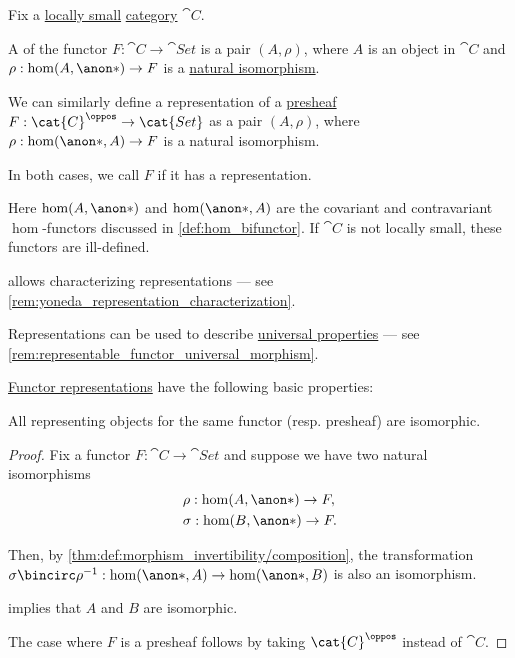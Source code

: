 \begin{definition}\label{def:functor_representation}
  Fix a \hyperref[def:small_category]{locally small} \hyperref[def:category]{category} \( \cat{C} \).

  A  of the functor \( F: \cat{C} \to \cat{Set} \) is a pair \( (A, \rho) \), where \( A \) is an object in \( \cat{C} \) and \( \rho: \hom(A, \anon*) \to F \) is a \hyperref[def:natural_isomorphism]{natural isomorphism}.

  We can similarly define a representation of a \hyperref[def:presheaf]{presheaf} \( F: \cat{C}^\oppos \to \cat{Set} \) as a pair \( (A, \rho) \), where \( \rho: \hom(\anon*, A) \to F \) is a natural isomorphism.

  In both cases, we call \( F \)  if it has a representation.
\end{definition}
\begin{comments}
  \item Here \( \hom(A, \anon*) \) and \( \hom(\anon*, A) \) are the covariant and contravariant \( \hom \)-functors discussed in \cref{def:hom_bifunctor}. If \( \cat{C} \) is not locally small, these functors are ill-defined.

  \item {} allows characterizing representations --- see \cref{rem:yoneda_representation_characterization}.

  \item Representations can be used to describe \hyperref[con:universal_property]{universal properties} --- see \cref{rem:representable_functor_universal_morphism}.
\end{comments}

\begin{proposition}\label{thm:def:functor_representation}
  \hyperref[def:functor_representation]{Functor representations} have the following basic properties:
  \begin{thmenum}
     All representing objects for the same functor (resp. presheaf) are isomorphic.
  \end{thmenum}
\end{proposition}
\begin{proof}
   Fix a functor \( F: \cat{C} \to \cat{Set} \) and suppose we have two natural isomorphisms
  \begin{align*}
    &\rho: \hom(A, \anon*) \to F, \\
    &\sigma: \hom(B, \anon*) \to F.
  \end{align*}

  Then, by \cref{thm:def:morphism_invertibility/composition}, the transformation \( \sigma \bincirc \rho^{-1}: \hom(\anon*, A) \to \hom(\anon*, B) \) is also an isomorphism.

   implies that \( A \) and \( B \) are isomorphic.

  The case where \( F \) is a presheaf follows by taking \( \cat{C}^\oppos \) instead of \( \cat{C} \).
\end{proof}

